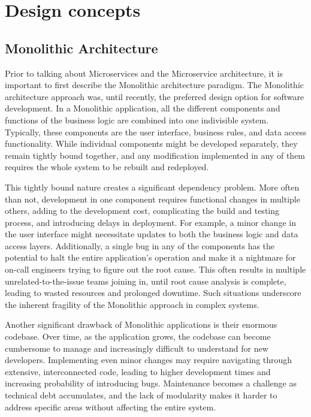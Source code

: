 \chapter{Design concepts} \label{ch:design_concepts}

\section{Monolithic Architecture}
 
Prior to talking about Microservices and the Microservice architecture, it is important to first describe the Monolithic architecture paradigm. The Monolithic architecture approach was, until recently, the preferred design option for software development. In a Monolithic application, all the different components and functions of the business logic are combined into one indivisible system\cite{monovsmicro}. Typically, these components are the user interface, business rules, and data access functionality. While individual components might be developed separately, they remain tightly bound together\cite{whatismono}, and any modification implemented in any of them requires the whole system to be rebuilt and redeployed\cite{app10175797}.

This tightly bound nature creates a significant dependency problem. More often than not, development in one component requires functional changes in multiple others, adding to the development cost, complicating the build and testing process, and introducing delays in deployment. For example, a minor change in the user interface might necessitate updates to both the business logic and data access layers. Additionally, a single bug in any of the components has the potential to halt the entire application's operation and make it a nightmare for on-call engineers trying to figure out the root cause. This often results in multiple unrelated-to-the-issue teams joining in, until root cause analysis is complete, leading to wasted resources and prolonged downtime. Such situations underscore the inherent fragility of the Monolithic approach in complex systems. 

Another significant drawback of Monolithic applications is their enormous codebase. Over time, as the application grows, the codebase can become cumbersome to manage and increasingly difficult to understand for new developers\cite{whatismono}. Implementing even minor changes may require navigating through extensive, interconnected code, leading to higher development times and increasing probability of introducing bugs. Maintenance becomes a challenge as technical debt accumulates, and the lack of modularity makes it harder to address specific areas without affecting the entire system. 

